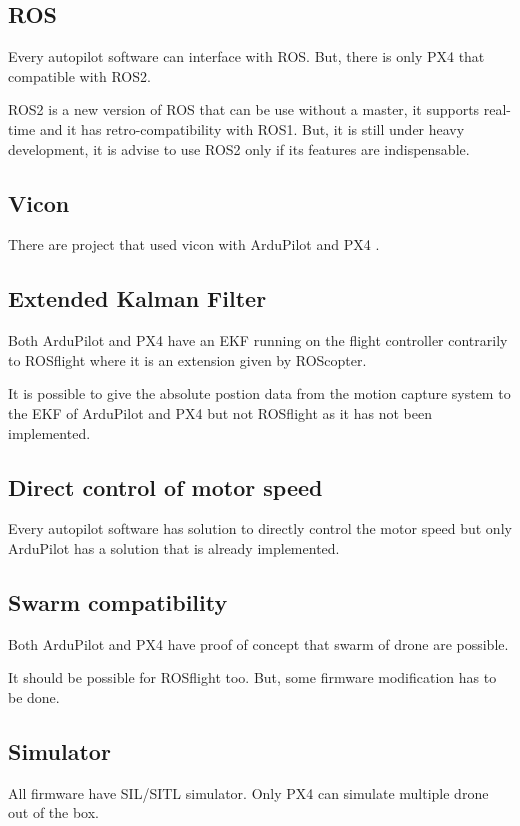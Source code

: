 \subsection{ROS}
Every autopilot software can interface with ROS. But, there is only PX4 that compatible with ROS2.

ROS2 is a new version of ROS that can be use without a master, it supports real-time and it has retro-compatibility with ROS1. But, it is still under heavy development, it is advise to use ROS2 only if its features are indispensable.

\subsection{Vicon}
There are project that used vicon with ArduPilot \cite{ardupilot_vicon} and PX4 \cite{px4_vicon}.

\subsection{Extended Kalman Filter}
Both ArduPilot and PX4 have an EKF running on the flight controller contrarily to ROSflight where it is an extension given by ROScopter.

It is possible to give the absolute postion data from the motion capture system to the EKF of ArduPilot and PX4 but not ROSflight as it has not been implemented.

\subsection{Direct control of motor speed}
Every autopilot software has solution to directly control the motor speed but only ArduPilot has a solution that is already implemented.

\subsection{Swarm compatibility}
Both ArduPilot \cite{ardupilot_multi_vehicle} and PX4 \cite{px4_multi_vehicle}
have proof of concept that swarm of drone are possible.

It should be possible for ROSflight \cite{github_rosflight_100} too.
But, some firmware modification has to be done.

\subsection{Simulator}
All firmware have SIL/SITL simulator.
Only PX4 can simulate multiple drone out of the box.


